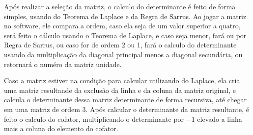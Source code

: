 \documentclass[12pt]{article}
\begin{document}
Após realizar a seleção da matriz, o calculo do determinante é feito de forma 
simples, usando do Teorema de Laplace e da Regra de Sarrus. Ao jogar a matriz 
no software, ele compara a ordem, caso ela seja de um valor superior a quatro, 
será feito o cálculo usando o Teorema de Laplace, e caso seja menor, fará ou 
por Regra de Sarrus, ou caso for de ordem 2 ou 1, fará o calculo do determinante 
usando da multiplicação da diagonal principal menos a diagonal secundária, ou 
retornará o numéro da matriz unidade.

Caso a matriz estiver na condição para calcular utilizando do Laplace, ela cria 
uma matriz resultande da exclusão da linha e da coluna da matriz original, e 
calcula o determinante dessa matriz determinante de forma recursiva, até chegar 
em uma matriz de ordem 3. Após calcular o determinante da matriz resultante, é 
feito o calculo do cofator, multiplicando o determinante por $-1$ elevado a 
linha mais a coluna do elemento do cofator.
\end{document}
